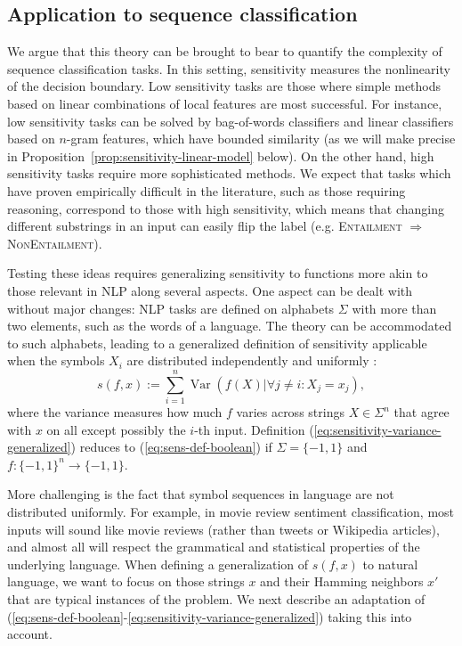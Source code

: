 \documentclass[11pt,a4paper]{article}
\begin{document}
\subsection{Application to sequence classification}
We argue that this theory can be brought to bear to quantify the complexity of sequence classification tasks.
In this setting, sensitivity measures the nonlinearity of the decision boundary.
Low sensitivity tasks are those where simple methods based on linear combinations of local features are most successful.
For instance, low sensitivity tasks can be solved by bag-of-words classifiers and linear classifiers based on $n$-gram features, which have bounded similarity (as we will make precise in Proposition~\ref{prop:sensitivity-linear-model} below). 
On the other hand, high sensitivity tasks require more sophisticated methods.
We expect that tasks which have proven empirically difficult in the literature, such as those requiring reasoning, correspond to those with high sensitivity, which means that changing different substrings in an input can easily flip the label (e.g. \textsc{Entailment} $\Rightarrow$ \textsc{NonEntailment}).

Testing these ideas requires generalizing sensitivity to functions more akin to those relevant in NLP along several aspects.
One aspect can be dealt with without major changes: NLP tasks are defined on alphabets $\Sigma$ with more than two elements, such as the words of a language.
The theory can be accommodated to such alphabets, leading to a generalized definition of sensitivity applicable when the symbols $X_i$ are distributed independently and uniformly \citep[rephrased based on][Def. 8.22]{odonnell2014analysis}:
\begin{equation}\label{eq:sensitivity-variance-generalized}
	s(f,x) := \sum_{i=1}^n \operatorname{Var}\left(f(X)| \forall j\neq i : X_j = x_{j} \right),
\end{equation}
where the variance measures how much $f$ varies across strings $X \in \Sigma^n$ that agree with $x$ on all except possibly the $i$-th input.
Definition (\ref{eq:sensitivity-variance-generalized}) reduces to (\ref{eq:sens-def-boolean}) if $\Sigma = \{-1,1\}$ and $f : \{-1,1\}^n\rightarrow \{-1,1\}$. %


More challenging is the fact that symbol sequences in language are not distributed uniformly.
For example, in movie review sentiment classification, most inputs will sound like movie reviews (rather than tweets or Wikipedia articles), and almost all will respect the grammatical and statistical properties of the underlying language. %
When defining a generalization of $s(f,x)$ to natural language, we want to focus on those strings $x$ and their Hamming neighbors $x'$ that are typical instances of the problem.
We next describe an adaptation of (\ref{eq:sens-def-boolean}-\ref{eq:sensitivity-variance-generalized}) taking this into account. 
\end{document}

